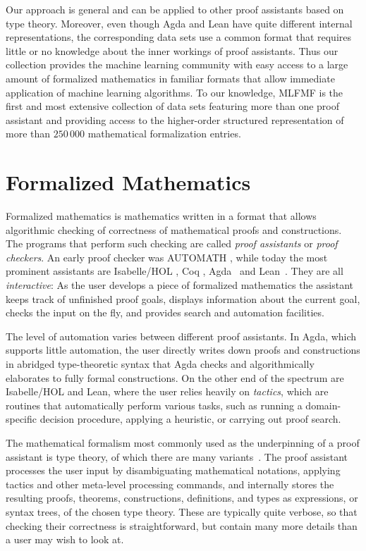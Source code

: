 \documentclass{article}
\begin{document}
Our approach is general and can be applied to other proof assistants based on type theory. Moreover, even though Agda and Lean have quite different internal representations, the corresponding data sets use a common format that requires little or no knowledge about the inner workings of proof assistants. Thus our collection provides the machine learning community with easy access to a large amount of formalized mathematics in familiar formats that allow immediate application of machine learning algorithms. To our knowledge, MLFMF is the first and most extensive collection of data sets featuring more than one proof assistant and providing access to the higher-order structured representation of more than $250\,000$ mathematical formalization entries.


\section{Formalized Mathematics}

Formalized mathematics is mathematics written in a format that allows algorithmic checking of correctness of mathematical proofs and constructions. The programs that perform such checking are called \emph{proof assistants} or \emph{proof checkers}. An early proof checker was AUTOMATH \citep{bruijn70:_autom}, while today the most prominent assistants are Isabelle/HOL \citep{isabelle,hol_inter_theor_prover,harrison:_hol_light}, Coq \citep{coq}, Agda~\citep{agda} and Lean~\citep{lean}. They are all \emph{interactive}: As the user develops a piece of formalized mathematics the assistant keeps track of unfinished proof goals, displays information about the current goal, checks the input on the fly, and provides search and automation facilities.

The level of automation varies between different proof assistants. In Agda, which supports little automation, the user directly writes down proofs and constructions in abridged type-theoretic syntax that Agda checks and algorithmically elaborates to fully formal constructions. On the other end of the spectrum are Isabelle/HOL and Lean, where the user relies heavily on \emph{tactics}, which are routines that automatically perform various tasks, such as running a domain-specific decision procedure, applying a heuristic, or carrying out proof search.

The mathematical formalism most commonly used as the underpinning of a proof assistant is type theory, of which there are many variants~\citep{church40,ML75,CoquandT:coc}. 
The proof assistant processes the user input by disambiguating mathematical notations, applying tactics and other meta-level processing commands, and internally stores the resulting proofs, theorems, constructions, definitions, and types as expressions, or syntax trees, of the chosen type theory. These are typically quite verbose, so that checking their correctness is straightforward, but contain many more details than a user may wish to look at. 
\end{document}
